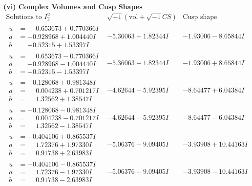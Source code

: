 \documentclass[1p]{elsarticle_modified}
\theoremstyle{definition}
\newcommand{\I}{\sqrt{-1}}
\begin{document}
\newpage\flushleft \textbf{(vi) Complex Volumes and Cusp Shapes}
$$\begin{array}{c|c|c}  
\text{Solutions to }I^u_{2}& \I (\text{vol} + \sqrt{-1}CS) & \text{Cusp shape}\\
 \hline 
\begin{aligned}
u &= \phantom{-}0.653673 + 0.770366 I \\
a &= -0.928968 + 1.004440 I \\
b &= -0.52315 + 1.53397 I\end{aligned}
 & -5.36063 + 1.82344 I & -1.93006 - 8.65844 I \\ \hline\begin{aligned}
u &= \phantom{-}0.653673 - 0.770366 I \\
a &= -0.928968 - 1.004440 I \\
b &= -0.52315 - 1.53397 I\end{aligned}
 & -5.36063 - 1.82344 I & -1.93006 + 8.65844 I \\ \hline\begin{aligned}
u &= -0.128068 + 0.981348 I \\
a &= \phantom{-}0.004238 + 0.701217 I \\
b &= \phantom{-}1.32562 + 1.38547 I\end{aligned}
 & -4.62644 - 5.92395 I & -8.64477 + 6.04384 I \\ \hline\begin{aligned}
u &= -0.128068 - 0.981348 I \\
a &= \phantom{-}0.004238 - 0.701217 I \\
b &= \phantom{-}1.32562 - 1.38547 I\end{aligned}
 & -4.62644 + 5.92395 I & -8.64477 - 6.04384 I \\ \hline\begin{aligned}
u &= -0.404106 + 0.865537 I \\
a &= \phantom{-}1.72376 + 1.97330 I \\
b &= \phantom{-}0.91738 + 2.63983 I\end{aligned}
 & -5.06376 - 9.09405 I & -3.93908 + 10.44163 I \\ \hline\begin{aligned}
u &= -0.404106 - 0.865537 I \\
a &= \phantom{-}1.72376 - 1.97330 I \\
b &= \phantom{-}0.91738 - 2.63983 I\end{aligned}
 & -5.06376 + 9.09405 I & -3.93908 - 10.44163 I \\ \hline\begin{aligned}

\end{aligned}
\end{array}$$
\end{document}
